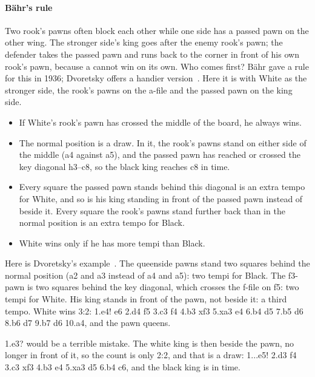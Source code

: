 
\paragraph{Bähr's rule}\label{bahr-rule}
Two rook's pawns often block each other while one side has a passed pawn on the other wing. The
stronger side's king goes after the enemy rook's pawn; the defender takes the passed pawn and runs
back to the corner in front of his own rook's pawn, because a  cannot win
on its own. Who comes first? Bähr gave a rule for this in
1936; Dvoretsky offers a handier version~\cite{Dvoretsky:2008-endgame-manual}. Here it is with
White as the stronger side, the rook's pawns on the a-file and the passed pawn on the king side.
\begin{itemize}
\item If White's rook's pawn has crossed the middle of the board, he always wins.
\item The normal position is a draw. In it, the rook's pawns stand on either side of the
middle (a4 against a5), and the passed pawn has reached or crossed the key diagonal h3--c8, so the
black king reaches c8 in time.
\item Every square the passed pawn stands behind this diagonal is an extra tempo for White, and so
is his king standing in front of the passed pawn instead of beside it. Every square the rook's
pawns stand further back than in the normal position is an extra tempo for Black.
\item White wins only if he has more tempi than Black.
\end{itemize}

Here is Dvoretsky's example~\cite{Dvoretsky:2008-endgame-manual}. The queenside pawns stand two
squares behind the normal position (a2 and a3 instead of a4 and a5): two tempi for Black. The
f3-pawn is two squares behind the key diagonal, which crosses the f-file on f5: two tempi for
White. His king stands in front of the pawn, not beside it: a third tempo. White wins 3:2:
1.\K e4! \K e6 2.\K d4 \K f5 3.\K c3 \K f4 4.\K b3 \K xf3 5.\K xa3 \K e4 6.\K b4 \K d5 7.\K b5
\K d6 8.\K b6 \K d7 9.\K b7 \K d6 10.a4, and the pawn queens.

1.\K e3? would be a terrible mistake. The white king is then beside the pawn, no longer in front
of it, so the count is only 2:2, and that is a draw: 1...\K e5! 2.\K d3 \K f4 3.\K c3 \K xf3
4.\K b3 \K e4 5.\K xa3 \K d5 6.\K b4 \K c6, and the black king is in time.
